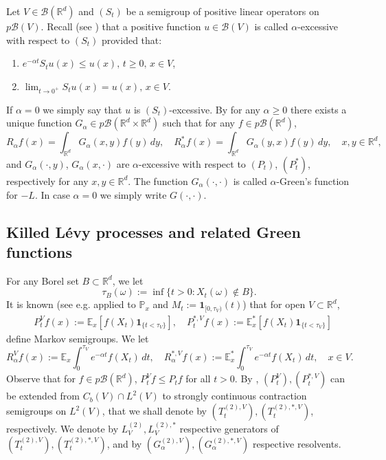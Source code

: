 \documentclass[11pt,a4paper,reqno]{amsart}
\theoremstyle{definition}
\numberwithin{equation}{section}
\begin{document}
Let $V\in\mathcal B(\mathbb R^d)$ and $(S_t)$ be  a semigroup of  positive linear operators on $p\mathscr B(V)$.
Recall (see \cite[Section II]{BG}) that   a positive function $u\in \mathscr B(V)$
is called $\alpha$-excessive with respect to  $(S_t)$ provided that:
\begin{enumerate}
\item[a)] $e^{-\alpha t}S_tu(x)\le u(x),\, t\ge 0,\, x\in V$,
\item[b)] $\lim_{t\to 0^+}S_tu(x)=u(x),\, x\in V$.
\end{enumerate}
If $\alpha=0$ we simply say that $u$ is $(S_t)$-excessive.
By \cite[Theorem VI.1.4]{BG} for any $\alpha\ge 0$  there exists a  unique
function $G_\alpha \in p\mathscr B(\mathbb R^d\times \mathbb R^d)$
such that for any $f\in p\mathscr B(\mathbb R^d)$,
\begin{equation}
\label{eq.GGG}
R_\alpha f(x)=\int_{\mathbb R^d} G_\alpha(x,y)f(y)\, dy,\quad R^{*}_\alpha f(x)=\int_{\mathbb R^d} G_\alpha(y,x)f(y)\, dy,\quad x,y\in\mathbb R^d,
\end{equation}
and  $G_\alpha(\cdot,y)$, $G_\alpha(x,\cdot)$ are  $\alpha$-excessive with respect to $(P_t)$, $(P^{*}_t)$, respectively
for any $x,y\in\mathbb R^d$.
The function $G_\alpha(\cdot,\cdot)$ is called $\alpha$-Green's function for $-L$. In case $\alpha=0$ we simply write 
 $G(\cdot,\cdot)$.



\subsection{Killed L\'evy processes and related Green functions}

For any Borel  set $B\subset\mathbb R^d$, we let 
\begin{equation}
\label{eq.hitt}
\tau_B(\omega):=\inf\{t>0: X_t(\omega)\notin B\}.
\end{equation}
It is known  (see e.g.  \cite[Theorem III.3.3]{BG} applied to $\mathbb P_x$ and  $M_t:=\mathbf1_{[0,\tau_V)}(t)$)
that   for open $V\subset\mathbb R^d$,
\begin{equation}
\label{eq.pdef}
\begin{split}
&P^{V}_tf(x):=\mathbb E_x [f(X_t)\mathbf 1_{\{t<\tau_V\}}],\quad P^{*,V}_tf(x):=\mathbb E^{*}_x [f(X_t)\mathbf 1_{\{t<\tau_V\}}]
\end{split}
\end{equation}
define Markov semigroups.
We let
\begin{equation}
\label{eq.rdef}
R^{V}_\alpha f(x):=\mathbb E_x \int_0^{\tau_V} e^{-\alpha t}f(X_t)\, dt,\quad
R^{*,V}_\alpha f(x):=\mathbb E^{*}_x \int_0^{\tau_V} e^{-\alpha t}f(X_t)\, dt,\quad x \in V.
\end{equation}
Observe that for  $f\in p\mathscr B(\mathbb R^d)$, $P^{V}_tf\le P_tf$ for all $t>0$.
By \cite[Theorem 3.5.7]{Oshima}, $(P^{V}_t), (P^{*,V}_t)$ 
can be extended from $C_b(V)\cap L^2(V)$ to  strongly continuous  contraction semigroups on $L^2(V)$, 
that we shall denote by  $(T^{(2),V}_t), (T^{(2),*,V}_t)$, respectively.
We denote by $L^{(2)}_{V}, L^{(2),*}_{V}$ respective generators of  $(T^{(2),V}_t), (T^{(2),*,V}_t)$, and by 
$(G^{(2),V}_\alpha), (G^{(2),*,V}_\alpha)$ respective resolvents.
\end{document}

